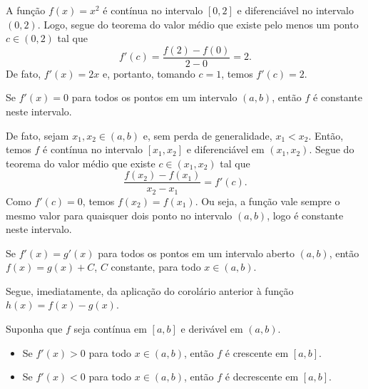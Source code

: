 \begin{ex}
  A função $f(x)=x^2$ é contínua no intervalo $[0,2]$ e diferenciável no intervalo $(0,2)$. Logo, segue do teorema do valor médio que existe pelo menos um ponto $c\in (0,2)$ tal que
  \begin{equation}
    f'(c)=\frac{f(2)-f(0)}{2-0}=2.
  \end{equation}
  De fato, $f'(x)=2x$ e, portanto, tomando $c=1$, temos $f'(c)=2$.
\end{ex}

\begin{corol}
  Se $f'(x)=0$ para todos os pontos em um intervalo $(a, b)$, então $f$ é constante neste intervalo.
\end{corol}
\begin{dem}
  De fato, sejam $x_1,x_2\in (a, b)$ e, sem perda de generalidade, $x_1<x_2$. Então, temos $f$ é contínua no intervalo $[x_1,x_2]$ e diferenciável em $(x_1,x_2)$. Segue do teorema do valor médio que existe $c\in (x_1,x_2)$ tal que
  \begin{equation}
    \frac{f(x_2)-f(x_1)}{x_2-x_1}=f'(c).
  \end{equation}
  Como $f'(c)=0$, temos $f(x_2)=f(x_1)$. Ou seja, a função vale sempre o mesmo valor para quaisquer dois ponto no intervalo $(a, b)$, logo é constante neste intervalo.
\end{dem}

\begin{corol}
  Se $f'(x)=g'(x)$ para todos os pontos em um intervalo aberto $(a,b)$, então $f(x)=g(x)+C$, $C$ constante, para todo $x\in (a,b)$.
\end{corol}
\begin{dem}
  Segue, imediatamente, da aplicação do corolário anterior à função $h(x)=f(x)-g(x)$.
\end{dem}

\begin{corol}\label{corol:mono_deriv}
  Suponha que $f$ seja contínua em $[a,b]$ e derivável em $(a,b)$.
  \begin{itemize}
  \item Se $f'(x)>0$ para todo $x\in (a,b)$, então $f$ é crescente em $[a,b]$.
  \item Se $f'(x)<0$ para todo $x\in (a,b)$, então $f$ é decrescente em $[a,b]$.
  \end{itemize}
\end{corol}

